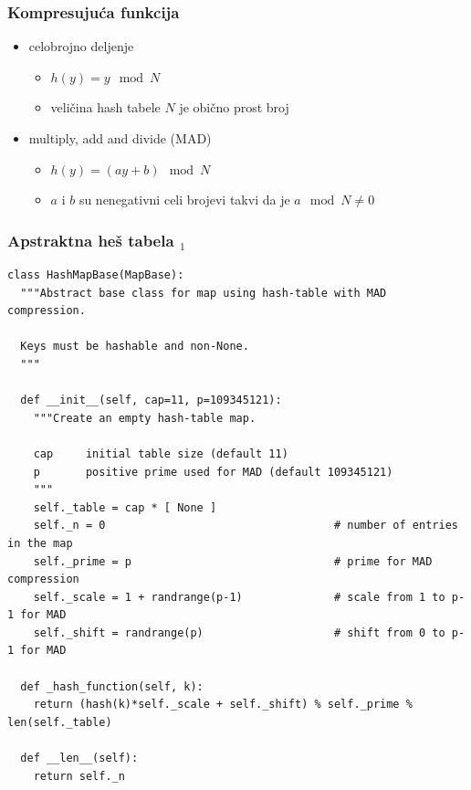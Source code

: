 \documentclass[compress,aspectratio=169]{beamer}
\begin{document}
\begin{frame}[fragile]
  \frametitle{Kompresujuća funkcija}
  \begin{itemize}
    \item celobrojno deljenje
    \begin{itemize}
      \item $h(y) = y \mod N$
      \item veličina hash tabele $N$ je obično prost broj
    \end{itemize}
    \item multiply, add and divide (MAD)
    \begin{itemize}
      \item $h(y) = (ay+b) \mod N$
      \item $a$ i $b$ su nenegativni celi brojevi takvi da je $a\mod N \neq 0$
    \end{itemize}
  \end{itemize}
\end{frame}

\begin{frame}
  \frametitle{Apstraktna heš tabela $_1$}
\begin{verbatim}
class HashMapBase(MapBase):
  """Abstract base class for map using hash-table with MAD compression.

  Keys must be hashable and non-None.
  """

  def __init__(self, cap=11, p=109345121):
    """Create an empty hash-table map.

    cap     initial table size (default 11)
    p       positive prime used for MAD (default 109345121)
    """
    self._table = cap * [ None ]
    self._n = 0                                   # number of entries in the map
    self._prime = p                               # prime for MAD compression
    self._scale = 1 + randrange(p-1)              # scale from 1 to p-1 for MAD
    self._shift = randrange(p)                    # shift from 0 to p-1 for MAD

  def _hash_function(self, k):
    return (hash(k)*self._scale + self._shift) % self._prime % len(self._table)

  def __len__(self):
    return self._n
\end{verbatim}
\end{frame}
\end{document}
